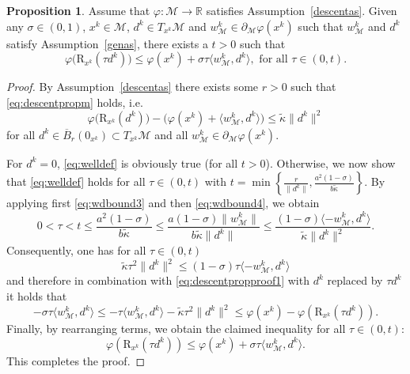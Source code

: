 \documentclass[a4paper, 12pt]{article}
\numberwithin{equation}{section}
\theoremstyle{bolddef}
\theoremstyle{definition}
\theoremstyle{boldplain}
\newtheorem{proposition}[definition]{Proposition}
\newcommand{\xk}{x^k}
\newcommand{\wk}{w^k}
\newcommand{\dk}{d^k}
\newcommand{\R}{\mathbb{R}}
\newcommand{\clball}{\overline{B}}
\newcommand{\retr}{\mathrm{R}}
\begin{document}
\begin{proposition}\label{prop:welldeflinesearch}
	Assume that $\varphi: \mathcal{M} \to \R$ satisfies Assumption~\ref{descentas}. Given any $\sigma \in (0, 1)$, $\xk \in \mathcal{M}$, $\dk \in T_{\xk}\mathcal{M}$ and $\wk_\mathcal{M} \in \partial_\mathcal{M} \varphi(\xk)$ such that $\wk_\mathcal{M}$ and $\dk$ satisfy Assumption~\ref{genas}, there exists a $t > 0$ such that
\begin{equation}\label{eq:welldef}
	\varphi\big(\retr_{\xk}(\tau \dk)\big) \leq \varphi(\xk) + \sigma \tau \langle \wk_\mathcal{M}, \dk\rangle, \text{ for all } \tau \in (0, t).
\end{equation}
\end{proposition}
\begin{proof}
	By Assumption~\ref{descentas} there exists some $r>0$ such that \eqref{eq:descentpropm} holds, i.e.
	\begin{equation}\label{eq:descentpropproof1}
		\varphi\big(\retr_{\xk}(\dk)\big) - \big(\varphi(\xk) + \langle \wk_\mathcal{M}, \dk \rangle\big) \leq \tilde \kappa \|\dk\|^2
	\end{equation}
	for all $\dk \in \clball_r(0_{\xk}) \subset T_{\xk} \mathcal{M}$ and all $\wk_\mathcal{M} \in \partial_\mathcal{M} \varphi(\xk)$.

	For $\dk = 0$, \eqref{eq:welldef} is obviously true (for all $t>0$). Otherwise, we now show that \eqref{eq:welldef} holds for all $\tau \in (0, t)$ with $t = \min\left\{\frac{r}{\|\dk\|}, \frac{a^2(1-\sigma)}{b\tilde \kappa}\right\}$. By applying first \eqref{eq:wdbound3} and then \eqref{eq:wdbound4}, we obtain
	\begin{equation*}
		0 < \tau < t \leq \frac{a^2(1-\sigma)}{b \tilde \kappa} \leq \frac{a (1-\sigma)\|\wk_\mathcal{M}\|}{b \tilde \kappa \| \dk \|}\leq \frac{(1-\sigma) \langle - \wk_\mathcal{M}, \dk \rangle}{\tilde \kappa \|\dk\|^2}.
	\end{equation*}
	Consequently, one has for all $\tau \in (0, t)$
	\begin{equation*}
		\tilde \kappa \tau^2 \|\dk\|^2 \leq (1-\sigma) \tau \langle -\wk_\mathcal{M}, \dk \rangle 
	\end{equation*}
	and therefore in combination with \eqref{eq:descentpropproof1} with $\dk$ replaced by $\tau \dk$ it holds that
	\begin{equation*}
		- \sigma \tau \langle \wk_\mathcal{M}, \dk \rangle \leq - \tau \langle \wk_\mathcal{M}, \dk \rangle - \tilde \kappa \tau^2 \|\dk\|^2 \leq \varphi(\xk) - \varphi(\retr_{\xk} (\tau \dk)).
	\end{equation*}
	Finally, by rearranging terms, we obtain the claimed inequality for all $\tau \in (0, t)$:
	\begin{equation*}
		\varphi(\retr_{\xk}(\tau \dk)) \leq \varphi(\xk) + \sigma \tau \langle \wk_\mathcal{M}, \dk \rangle.
	\end{equation*}
	This completes the proof.
\end{proof}
\end{document}
